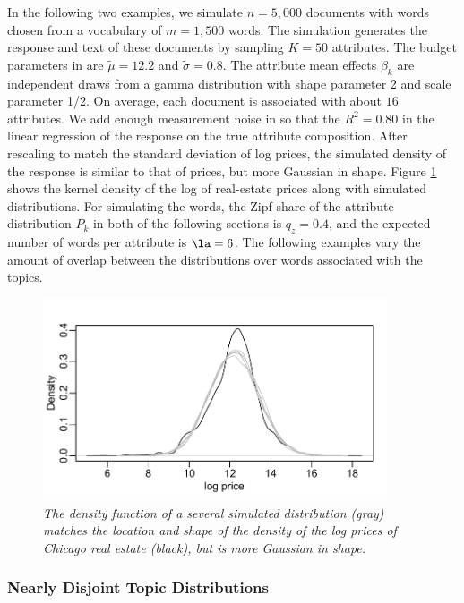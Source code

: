 \documentclass[12pt]{article}
\begin{document}
In the following two examples, we simulate $n = 5,000$ documents with words chosen from a vocabulary of $m = 1,500$ words.  The simulation generates the response and text of these documents by sampling $K = 50$ attributes.  The budget parameters in  are $\tilde\mu = 12.2$ and $\tilde\sigma = 0.8$.  The attribute mean effects $\beta_k$ are independent draws from a gamma distribution with shape parameter 2 and scale parameter 1/2.  On average, each document is associated with about $16$ attributes.  We add enough measurement noise in  so that the $R^2 =0.80$ in the linear regression of the response on the true attribute composition.  After rescaling to match the standard deviation of log prices, the simulated density of the response is similar to that of prices, but more Gaussian in shape.  Figure \ref{fig:density} shows the kernel density of the log of real-estate prices along with simulated distributions.  For simulating the words, the Zipf share of the attribute distribution $P_k$ in both of the following sections is $q_z = 0.4$, and the expected number of words per attribute is $\la = 6$.  The following examples vary the amount of overlap between the distributions over words associated with the topics.


\begin{figure}
\caption{  \label{fig:density}  
  {\sl The density function of a several simulated distribution (gray) matches the location and shape of the density of the log prices of Chicago real estate (black), but is more Gaussian in shape.}  }
  \centerline{ \includegraphics[width=4in]{figures/density.pdf} }
\end{figure}
  
 
 \subsubsection{Nearly Disjoint Topic Distributions} %
  
\end{document}
